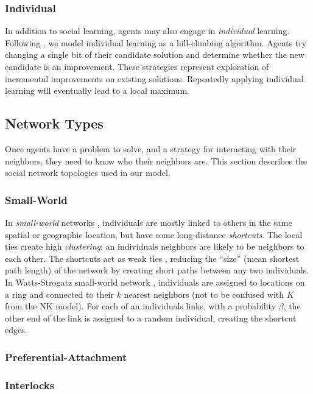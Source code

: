 \documentclass[manuscript,screen,review,acmsmall]{acmart}
\begin{document}
\subsubsection{Individual}
In addition to social learning, agents may also engage in {\em individual}
learning.
Following \cite{barkoczi_social_2016},
we model individual learning as a hill-climbing algorithm.
Agents try changing a single bit of their candidate solution and determine
whether the new candidate is an improvement.
These strategies represent exploration of incremental improvements on existing
solutions.
Repeatedly applying individual learning will eventually lead to a local
maximum.

\subsection{Network Types}
Once agents have a problem to solve, and a strategy for interacting with
their neighbors, they need to know who their neighbors are.
This section describes the social network topologies used in our model.

\subsubsection{Small-World}
In {\em small-world} networks
\cite{watts_collective_1998},
individuals are mostly linked to others in the
same spatial or geographic location,
but have some long-distance {\em shortcuts}.
The local ties create high {\em clustering}:
an individuals neighbors are likely to be neighbors to each other.
The shortcuts act as weak ties \cite{granovetter_strength_1973},
reducing the ``size'' (mean shortest path length)
of the network by creating short paths
between any two individuals.
In Watts-Strogatz small-world network \cite{watts_collective_1998},
individuals are assigned to locations on a ring and connected to their
$k$ nearest neighbors (not to be confused with $K$ from the NK model).
For each of an individuals links,
with a probability $\beta$,
the other end of the link is assigned to a random individual,
creating the shortcut edges.

\subsubsection{Preferential-Attachment}

\subsubsection{Interlocks}
\end{document}

